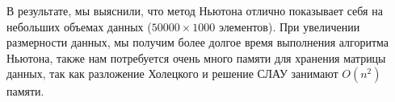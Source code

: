 \documentclass{article}
\begin{document}
	В результате, мы выяснили, что метод Ньютона отлично показывает себя на небольших объемах данных ($50000 \times 1000$ элементов). При увеличении размерности данных, мы получим более долгое время выполнения алгоритма Ньютона, также нам потребуется очень много памяти для хранения матрицы данных, так как разложение Холецкого и решение СЛАУ занимают $O(n^2)$ памяти. 
	
	
	
	
	
	
	
	
	
	
\end{document}
